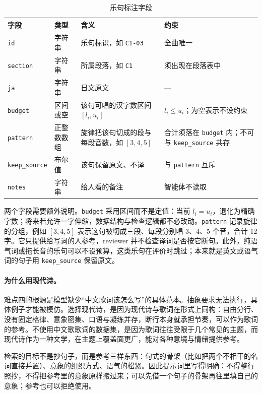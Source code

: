 \documentclass[12pt, a4paper]{ctexart}
\numberwithin{table}{section}
\numberwithin{figure}{section}
\begin{document}
\begin{table}[htbp]
  \centering
  \small
  \caption{乐句标注字段}
  \label{tab:budget-fields}
  \begin{tabular}{p{}p{}p{}p{}}
    \toprule
    字段 & 类型 & 含义 & 约束 \\
    \midrule
    \texttt{id} & 字符串 & 乐句标识，如 \texttt{C1-03} & 全曲唯一 \\
    \texttt{section} & 字符串 & 所属段落，如 \texttt{C1} & 须出现在段落表中 \\
    \texttt{ja} & 字符串 & 日文原文 & — \\
    \texttt{budget} & 区间或空 & 该句可唱的汉字数区间 $[l_i,u_i]$ & $l_i \le u_i$；为空表示不设约束 \\
    \texttt{pattern} & 正整数数组 & 旋律把该句切成的段与每段音数，如 $[3,4,5]$ & 合计须落在 \texttt{budget} 内；不可与 \texttt{keep\_source} 共存 \\
    \texttt{keep\_source} & 布尔值 & 该句保留原文、不译 & 与 \texttt{pattern} 互斥 \\
    \texttt{notes} & 字符串 & 给人看的备注 & 智能体不读取 \\
    \bottomrule
  \end{tabular}
\end{table}

两个字段需要额外说明。\texttt{budget} 采用区间而不是定值：当前 $l_i=u_i$，退化为精确字数；将来若允许一字伸缩，数据结构与检查逻辑都不必改动。\texttt{pattern} 记录旋律的分组，例如 $[3,4,5]$ 表示这句被切成三段、每段分别唱 3、4、5 个音，合计 12 字。它只提供给写词的人参考，reviewer 并不检查译词是否按它断句。此外，纯语气词或拖长音的乐句可以不设预算，这类乐句在评价时跳过；本来就是英文或语气词的句子用 \texttt{keep\_source} 保留原文。


\paragraph{为什么用现代诗。}
难点四的根源是模型缺少“中文歌词该怎么写”的具体范本。抽象要求无法执行，具体例子才能被模仿。选择现代诗，是因为现代诗与歌词在形式上同构：自由分行、没有固定格律、意象密集、口语与凝练并存，断行本身就承担节奏，可以作为歌词的参考。不使用中文歌歌词的数据集，是因为歌词往往受限于几个常见的主题，而现代诗作为一种文学，在主题上覆盖面更广，能对各种意境与情绪提供参考。

检索的目标不是抄句子，而是参考三样东西：句式的骨架（比如把两个不相干的名词直接并置）、意象的组织方式、语气的松紧。因此提示词里写得明确：不得整行照抄，不得把参考里的意象原样搬过来；可以先借一个句子的骨架再往里填自己的意象；参考也可以拒绝使用。
\end{document}

